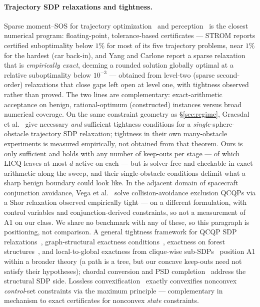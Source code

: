 \documentclass[11pt]{article}
\theoremstyle{definition}
\theoremstyle{remark}
\renewcommand{\_}{\ifdim\fontdimen3\font=0pt\relax\char`\_\else\textunderscore\fi\hspace{0pt}}
\begin{document}
\paragraph{Trajectory SDP relaxations and tightness.} Sparse moment--SOS for
trajectory optimization~\cite{strom2024} and
perception~\cite{yang2023perception} is the closest numerical program:
floating-point, tolerance-based certificates --- STROM reports certified
suboptimality below $1\%$ for most of its five trajectory problems, near
$1\%$ for the hardest (car back-in), and Yang and Carlone report a sparse
relaxation that is \emph{empirically exact}, deeming a rounded solution
globally optimal at a relative suboptimality below $10^{-3}$ --- obtained
from level-two (sparse second-order) relaxations that close gaps left open at
level one, with tightness observed rather than proved. The two lines are
complementary: exact-arithmetic acceptance on benign, rational-optimum
(constructed) instances versus broad numerical coverage. On the same
constraint geometry as \S\ref{sec:regime}, Graesdal et
al.~\cite{graesdal2026} give necessary \emph{and} sufficient tightness
conditions for a \emph{single}-sphere-obstacle trajectory SDP relaxation;
tightness in their own many-obstacle experiments is measured empirically, not
obtained from that theorem. Ours is only sufficient and holds with any number
of keep-outs per stage --- of which LICQ leaves at most $d$ active on each
--- but is solver-free and checkable in exact arithmetic along the sweep, and
their single-obstacle conditions delimit what a sharp benign boundary could
look like. In the adjacent domain of spacecraft conjunction avoidance, Vega
et al.~\cite{vega2025} solve collision-avoidance exclusion QCQPs via a Shor
relaxation observed empirically tight --- on a different formulation, with
control variables and conjunction-derived constraints, so not a measurement
of A1 on our class. We share no benchmark with any of these, so this
paragraph is positioning, not comparison. A general tightness framework for
QCQP SDP relaxations~\cite{wang2021tightness}, graph-structural exactness
conditions~\cite{sojoudi2014}, exactness on forest
structures~\cite{azuma2020}, and local-to-global exactness from clique-wise
sub-SDPs~\cite{kojima2026} position A1 within a broader theory (a path is a
tree, but our concave keep-outs need not satisfy their hypotheses); chordal
conversion and PSD completion~\cite{zhang2023,grone1984} address the
structural SDP side. Lossless convexification~\cite{acikmese2011} exactly
convexifies nonconvex \emph{control}-set constraints via the maximum
principle --- complementary in mechanism to exact certificates for nonconvex
\emph{state} constraints.
\end{document}
